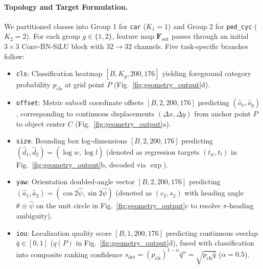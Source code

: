 \paragraph{Topology and Target Formulation.}
We partitioned classes into Group 1 for \texttt{car} ($K_1 = 1$) and Group 2 for \texttt{ped\_cyc} ($K_2 = 2$). For each group $g \in \{1, 2\}$, feature map $\mathbf{F}_{\mathrm{out}}$ passes through an initial $3 \times 3$ Conv-BN-SiLU block with $32 \rightarrow 32$ channels. Five task-specific branches follow:
\begin{itemize}
    \item \texttt{cls}: Classification heatmap $[B, K_g, 200, 176]$ yielding foreground category probability $p_{\mathrm{cls}}$ at grid point $P$ (Fig.~\ref{fig:geometry_output}d).
    \item \texttt{offset}: Metric subcell coordinate offsets $[B,\allowbreak 2,\allowbreak 200,\allowbreak 176]$ predicting $(\hat{o}_x, \hat{o}_y)$, corresponding to continuous displacements $(\Delta x, \Delta y)$ from anchor point $P$ to object center $C$ (Fig.~\ref{fig:geometry_output}a).
    \item \texttt{size}: Bounding box log-dimensions $[B, 2, 200, 176]$ predicting $(\hat{d}_1, \hat{d}_2) = (\log \hat{w}, \log \hat{l})$ (denoted as regression targets $(t_w, t_l)$ in Fig.~\ref{fig:geometry_output}b, decoded via $\exp$).
    \item \texttt{yaw}: Orientation doubled-angle vector $[B, 2, 200, 176]$ predicting $(\hat{a}_1, \hat{a}_2) = (\cos 2\hat{\psi}, \sin 2\hat{\psi})$ (denoted as $(c_2, s_2)$ with heading angle $\theta \equiv \hat{\psi}$ on the unit circle in Fig.~\ref{fig:geometry_output}c to resolve $\pi$-heading ambiguity).
    \item \texttt{iou}: Localization quality score $[B, 1, 200, 176]$ predicting continuous overlap $\hat{q} \in [0, 1]$ ($q(P)$ in Fig.~\ref{fig:geometry_output}d), fused with classification into composite ranking confidence $s_{\mathrm{det}} = (p_{\mathrm{cls}})^{1-\alpha} \hat{q}^\alpha = \sqrt{p_{\mathrm{cls}} \hat{q}}$ ($\alpha=0.5$).
\end{itemize}

